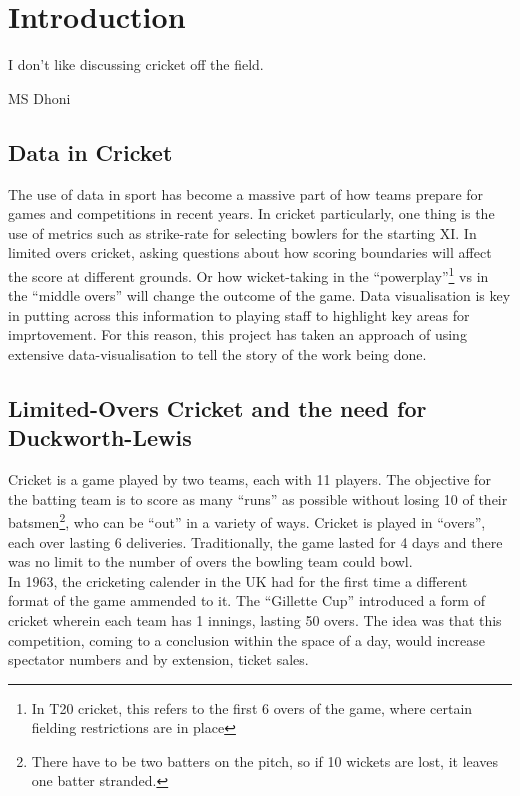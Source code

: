 \chapter{Introduction}

\epigraph{I don't like discussing cricket off the field.}{MS Dhoni}

\section{Data in Cricket}
The use of data in sport has become a massive part of how teams prepare for games and competitions in recent years. In cricket particularly, one thing is the use
of metrics such as strike-rate for selecting bowlers for the starting XI. In limited overs cricket, asking questions about how scoring boundaries will affect
the score at different grounds. Or how wicket-taking in the ``powerplay''\footnote{In T20 cricket, this refers to the first 6 overs of the game, where certain fielding restrictions are in place}
vs in the ``middle overs'' will change the outcome of the game. Data visualisation is key in putting across this information to playing staff to highlight key areas for
imprtovement. For this reason, this project has taken an approach of using extensive data-visualisation to tell the story of the work being done. 

\section{Limited-Overs Cricket and the need for Duckworth-Lewis}
Cricket is a game played by two teams, each with 11 players. The objective for the batting team is to score as many ``runs'' as possible
without losing 10 of their batsmen\footnote{There have to be two batters on the pitch, so if 10 wickets are lost, it leaves one batter stranded.}, 
who can be ``out'' in a variety of ways. Cricket is played in ``overs'', each over lasting 6 deliveries. Traditionally, the game lasted for 4 days
and there was no limit to the number of overs the bowling team could bowl. \\

In 1963, the cricketing calender in the UK had for the first time a different format of the game ammended to it.
The ``Gillette Cup'' introduced a form of cricket wherein each team has 1 innings, lasting 50 overs. The idea was 
that this competition, coming to a conclusion within the space of a day, would increase spectator numbers and by extension,
ticket sales.\\

